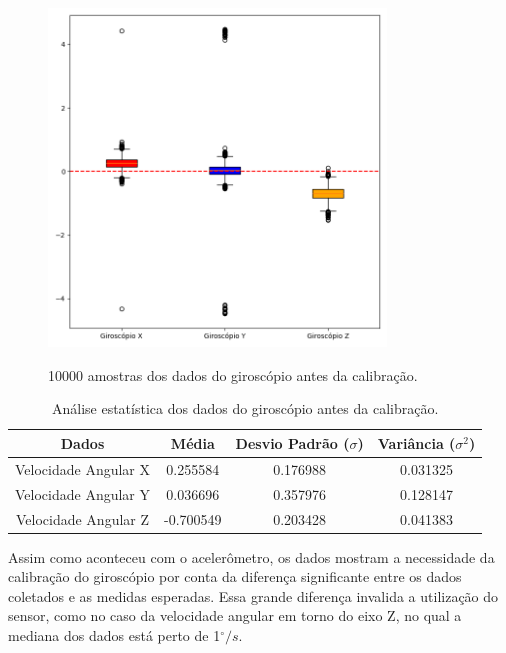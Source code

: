 \documentclass[acronym, symbols, table, deposito]{fei}
\begin{document}
	\begin{figure}[!htb]
		\centering
		\caption{10000 amostras dos dados do giroscópio antes da calibração.}
		\includegraphics[width=0.8\textwidth]{dados_giroscopio_errados.png}
		\label{fig:dados_giroscopio_errado}
	\end{figure}
	
	\begin{table}[!htb]
		\centering
		\caption{Análise estatística dos dados do giroscópio antes da calibração.}\label{tab:giroscopio_antes_calibracao}
		\begin{tabular}{|c|c|c|c|}
			\hline
			Dados & Média & Desvio Padrão ($\sigma$) & Variância ($\sigma^2$) \\ \hline
			\small Velocidade Angular X & 0.255584  & 0.176988 & 0.031325 \\ \hline
			\small Velocidade Angular Y & 0.036696  & 0.357976 & 0.128147 \\ \hline
			\small Velocidade Angular Z & -0.700549 & 0.203428 & 0.041383 \\ \hline	
		\end{tabular}
	\end{table}
	
	Assim como aconteceu com o acelerômetro, os dados mostram a necessidade da calibração do giroscópio por conta da diferença significante entre os dados coletados e as medidas esperadas. Essa grande diferença invalida a utilização do sensor, como no caso da velocidade angular em torno do eixo Z, no qual a mediana dos dados está perto de 1$^\circ/s$.
	
\end{document}
